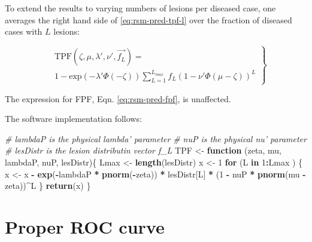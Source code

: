 \documentclass[
]{book}
\newenvironment{Shaded}{\begin{snugshade}}{\end{snugshade}}
\newcommand{\CommentTok}[1]{\textcolor[rgb]{0.56,0.35,0.01}{\textit{#1}}}
\newcommand{\ControlFlowTok}[1]{\textcolor[rgb]{0.13,0.29,0.53}{\textbf{#1}}}
\newcommand{\DecValTok}[1]{\textcolor[rgb]{0.00,0.00,0.81}{#1}}
\newcommand{\KeywordTok}[1]{\textcolor[rgb]{0.13,0.29,0.53}{\textbf{#1}}}
\newcommand{\NormalTok}[1]{#1}
\newcommand{\OperatorTok}[1]{\textcolor[rgb]{0.81,0.36,0.00}{\textbf{#1}}}
\newcommand{\StringTok}[1]{\textcolor[rgb]{0.31,0.60,0.02}{#1}}
\begin{document}
To extend the results to varying numbers of lesions per diseased case, one averages the right hand side of \eqref{eq:rsm-pred-tpf-l} over the fraction of diseased cases with \(L\) lesions:

\begin{equation}
\left.
\begin{aligned}
& \text{TPF}\left (\zeta , \mu, \lambda', \nu', \overrightarrow{f_L} \right ) =  \\
& 1 - \text{exp}\left ( -\lambda' \Phi \left ( -\zeta \right )\right ) 
\sum_{L=1}^{L_{max}} f_L  \left ( 1 - \nu' \Phi \left ( \mu -\zeta \right ) \right )^L 
\end{aligned}
\right \}
\label{eq:rsm-pred-tpf}
\end{equation}

The expression for FPF, Eqn. \eqref{eq:rsm-pred-fpf}, is unaffected.

The software implementation follows:

\begin{Shaded}
\begin{Highlighting}[]
\CommentTok{# lambdaP is the physical lambda' parameter}
\CommentTok{# nuP is the physical nu' parameter}
\CommentTok{# lesDistr is the lesion distributin vector f_L}
\NormalTok{TPF <-}\StringTok{ }\ControlFlowTok{function}\NormalTok{ (zeta, mu, lambdaP, nuP, lesDistr)\{}
\NormalTok{  Lmax <-}\StringTok{ }\KeywordTok{length}\NormalTok{(lesDistr)}
\NormalTok{  x <-}\StringTok{ }\DecValTok{1}
  \ControlFlowTok{for}\NormalTok{ (L }\ControlFlowTok{in} \DecValTok{1}\OperatorTok{:}\NormalTok{Lmax ) \{}
\NormalTok{    x <-}\StringTok{ }\NormalTok{x }\OperatorTok{-}\StringTok{ }\KeywordTok{exp}\NormalTok{(}\OperatorTok{-}\NormalTok{lambdaP }\OperatorTok{*}\StringTok{ }\KeywordTok{pnorm}\NormalTok{(}\OperatorTok{-}\NormalTok{zeta)) }\OperatorTok{*}\StringTok{ }\NormalTok{lesDistr[L] }\OperatorTok{*}\StringTok{ }\NormalTok{(}\DecValTok{1} \OperatorTok{-}\StringTok{ }\NormalTok{nuP }\OperatorTok{*}\StringTok{ }\KeywordTok{pnorm}\NormalTok{(mu }\OperatorTok{-}\StringTok{ }\NormalTok{zeta))}\OperatorTok{^}\NormalTok{L}
\NormalTok{  \}}
  \KeywordTok{return}\NormalTok{(x)}
\NormalTok{\}}
\end{Highlighting}
\end{Shaded}

\hypertarget{rsm-pred-roc-curve-proper}{%
\section{Proper ROC curve}\label{rsm-pred-roc-curve-proper}}
\end{document}
